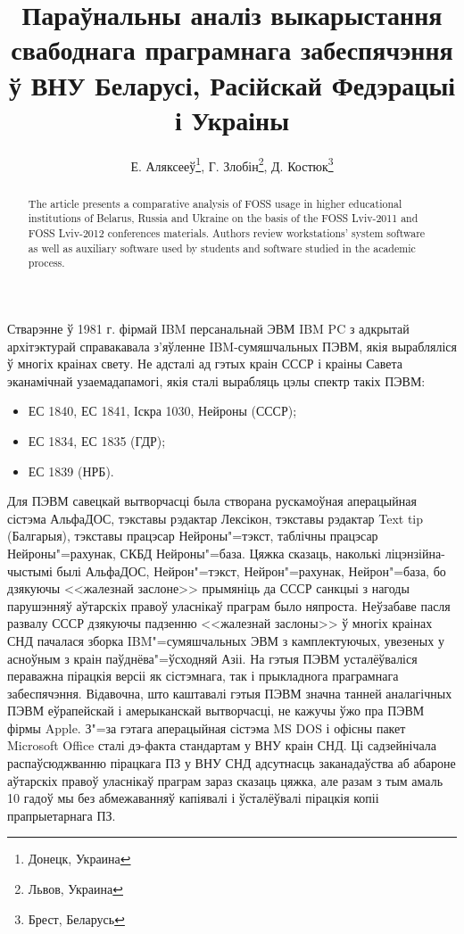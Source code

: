 \documentclass[10pt, a5paper]{article}
\begin{document}
\title{Параўнальны аналіз выкарыстання свабоднага праграмнага забеспячэння ў ВНУ Беларусі, Расійскай Федэрацыі і Украіны}%

\author{Е. Аляксееў\footnote{Донецк, Украина}, Г. Злобін\footnote{Львов, Украина}, Д. Костюк\footnote{Брест, Беларусь}}
\maketitle

\begin{abstract}
The article presents a comparative analysis of FOSS usage in higher educational institutions of Belarus, Russia and Ukraine on the basis of the FOSS Lviv-2011 and FOSS Lviv-2012 conferences materials. Authors review workstations' system software as well as auxiliary software used by students and software studied in the academic process.
\end{abstract}

Стварэнне ў 1981 г. фірмай IBM персанальнай ЭВМ IBM PC з адкрытай архітэктурай справакавала з'яўленне IBM-сумяшчальных ПЭВМ, якія вырабляліся ў многіх краінах свету. Не адсталі ад гэтых краін СССР і краіны Савета эканамічнай узаемадапамогі, якія сталі вырабляць цэлы спектр такіх ПЭВМ:

\begin{itemize}
  \item ЕС 1840, ЕС 1841, Іскра 1030, Нейроны (СССР);
  \item ЕС 1834, ЕС 1835 (ГДР);
  \item ЕС 1839 (НРБ).
\end{itemize}

Для ПЭВМ савецкай вытворчасці была створана рускамоўная аперацыйная сістэма
АльфаДОС, тэкставы рэдактар Лексікон, тэкставы рэдактар Text tip (Балгарыя),
тэкставы працэсар Нейроны"=тэкст, таблічны працэсар Нейроны"=рахунак, СКБД
Нейроны"=база. Цяжка сказаць, наколькі ліцэнзійна-чыстымі былі АльфаДОС,
Нейрон"=тэкст, Нейрон"=рахунак, Нейрон"=база, бо дзякуючы <<жа\-лез\-най заслоне>>
прымяніць да СССР санкцыі з нагоды парушэнняў аўтарскіх правоў уласнікаў
праграм было няпроста. Неўзабаве пасля развалу СССР дзякуючы падзенню
<<жалезнай заслоны>> ў многіх краінах СНД пачалася зборка IBM"=сумяшчальных ЭВМ
з камплектуючых, увезеных у асноўным з краін паўднёва"=ўсходняй Азіі. На гэтыя
ПЭВМ усталёўваліся пераважна пірацкія версіі як сістэмнага, так і прыкладнога
праграмнага забеспячэння. Відавочна, што каштавалі гэтыя ПЭВМ значна танней
аналагічных ПЭВМ еўрапейскай і амерыканскай вытворчасці, не кажучы ўжо пра
ПЭВМ фірмы Apple. З"=за гэтага аперацыйная сістэма MS DOS і офісны пакет Microsoft Office
сталі дэ-факта стандартам у ВНУ краін СНД. Ці садзейнічала распаўсюджванню
пірацкага ПЗ у ВНУ СНД адсутнасць заканадаўства аб абароне аўтарскіх правоў
уласнікаў праграм зараз сказаць цяжка, але разам з тым амаль 10 гадоў мы без
абмежаванняў капіявалі і ўсталёўвалі пірацкія копіі прапрыетарнага ПЗ.
\end{document}
